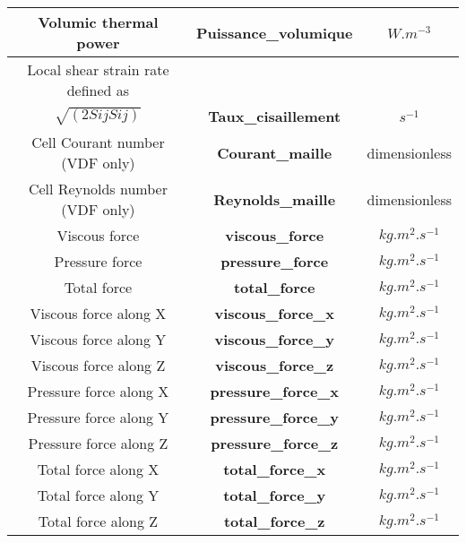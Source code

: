 \begin{longtable}[hcr]{|c|c|c|}
Volumic thermal power                           & \textbf{Puissance\_volumique}             & $W.m^{-3}$ \\ \hline
Local shear strain rate defined as              &                                           & \\
$\sqrt{(2SijSij)}$                              & \textbf{Taux\_cisaillement}               & $s^{-1}$ \\ \hline
Cell Courant number (VDF only)                  & \textbf{Courant\_maille}                  & dimensionless \\ \hline
Cell Reynolds number (VDF only)                 & \textbf{Reynolds\_maille}                 & dimensionless \\ \hline
Viscous force                                   & \textbf{viscous\_force}                   & $kg.m^{2}.s^{-1}$ \\ \hline
Pressure force                                  & \textbf{pressure\_force}                  & $kg.m^{2}.s^{-1}$ \\ \hline
Total force                                     & \textbf{total\_force}                     & $kg.m^{2}.s^{-1}$ \\ \hline
Viscous force along X                           & \textbf{viscous\_force\_x}                & $kg.m^{2}.s^{-1}$ \\ \hline
Viscous force along Y                           & \textbf{viscous\_force\_y}                & $kg.m^{2}.s^{-1}$ \\ \hline
Viscous force along Z                           & \textbf{viscous\_force\_z}                & $kg.m^{2}.s^{-1}$ \\ \hline
Pressure force along X                          & \textbf{pressure\_force\_x}               & $kg.m^{2}.s^{-1}$ \\ \hline
Pressure force along Y                          & \textbf{pressure\_force\_y}               & $kg.m^{2}.s^{-1}$ \\ \hline
Pressure force along Z                          & \textbf{pressure\_force\_z}               & $kg.m^{2}.s^{-1}$ \\ \hline
Total force along X                             & \textbf{total\_force\_x}                  & $kg.m^{2}.s^{-1}$ \\ \hline
Total force along Y                             & \textbf{total\_force\_y}                  & $kg.m^{2}.s^{-1}$ \\ \hline
Total force along Z                             & \textbf{total\_force\_z}                  & $kg.m^{2}.s^{-1}$ \\ \hline
\end{longtable}

